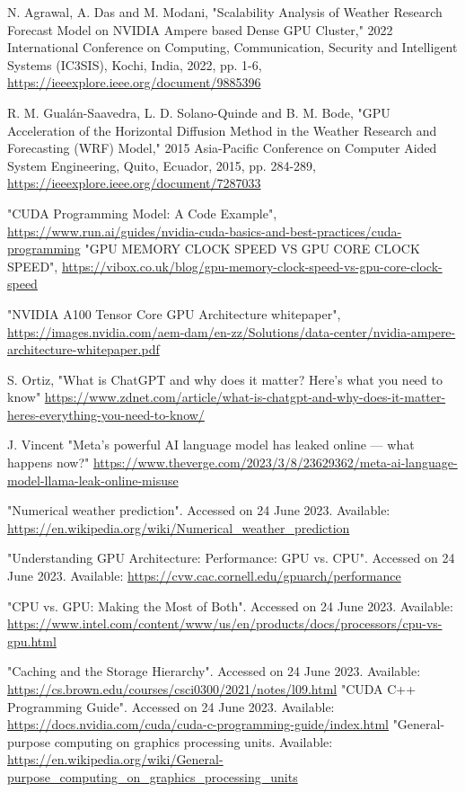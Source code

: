 \documentclass[conference]{IEEEtran}
\begin{document}
\begin{thebibliography}{00}
 N. Agrawal, A. Das and M. Modani, "Scalability Analysis of Weather Research Forecast Model on NVIDIA Ampere based Dense GPU Cluster," 2022 International Conference on Computing, Communication, Security and Intelligent Systems (IC3SIS), Kochi, India, 2022, pp. 1-6, \url{https://ieeexplore.ieee.org/document/9885396}

 R. M. Gualán-Saavedra, L. D. Solano-Quinde and B. M. Bode, "GPU Acceleration of the Horizontal Diffusion Method in the Weather Research and Forecasting (WRF) Model," 2015 Asia-Pacific Conference on Computer Aided System Engineering, Quito, Ecuador, 2015, pp. 284-289, \url{https://ieeexplore.ieee.org/document/7287033}

 "CUDA Programming Model: A Code Example",
\url{https://www.run.ai/guides/nvidia-cuda-basics-and-best-practices/cuda-programming}
 "GPU MEMORY CLOCK SPEED VS GPU CORE CLOCK SPEED",
\url{https://vibox.co.uk/blog/gpu-memory-clock-speed-vs-gpu-core-clock-speed}

 "NVIDIA A100 Tensor Core GPU Architecture whitepaper",
\url{https://images.nvidia.com/aem-dam/en-zz/Solutions/data-center/nvidia-ampere-architecture-whitepaper.pdf}

 S. Ortiz, "What is ChatGPT and why does it matter? Here's what you need to know" \url{https://www.zdnet.com/article/what-is-chatgpt-and-why-does-it-matter-heres-everything-you-need-to-know/}

 J. Vincent "Meta’s powerful AI language model has leaked online — what happens now?" \url{https://www.theverge.com/2023/3/8/23629362/meta-ai-language-model-llama-leak-online-misuse}


 "Numerical weather prediction". Accessed on 24 June 2023. Available: \url{https://en.wikipedia.org/wiki/Numerical_weather_prediction}

 "Understanding GPU Architecture: Performance: GPU vs. CPU". Accessed on 24 June 2023. Available: \url{https://cvw.cac.cornell.edu/gpuarch/performance}

 "CPU vs. GPU: Making the Most of Both". Accessed on 24 June 2023. Available: \url{https://www.intel.com/content/www/us/en/products/docs/processors/cpu-vs-gpu.html}

 "Caching and the Storage Hierarchy". Accessed on 24 June 2023. Available: \url{https://cs.brown.edu/courses/csci0300/2021/notes/l09.html}
 "CUDA C++ Programming Guide". Accessed on 24 June 2023. Available: \url{https://docs.nvidia.com/cuda/cuda-c-programming-guide/index.html}
 "General-purpose computing on graphics processing units. Available: \url{https://en.wikipedia.org/wiki/General-purpose_computing_on_graphics_processing_units}




\end{thebibliography}
\end{document}
